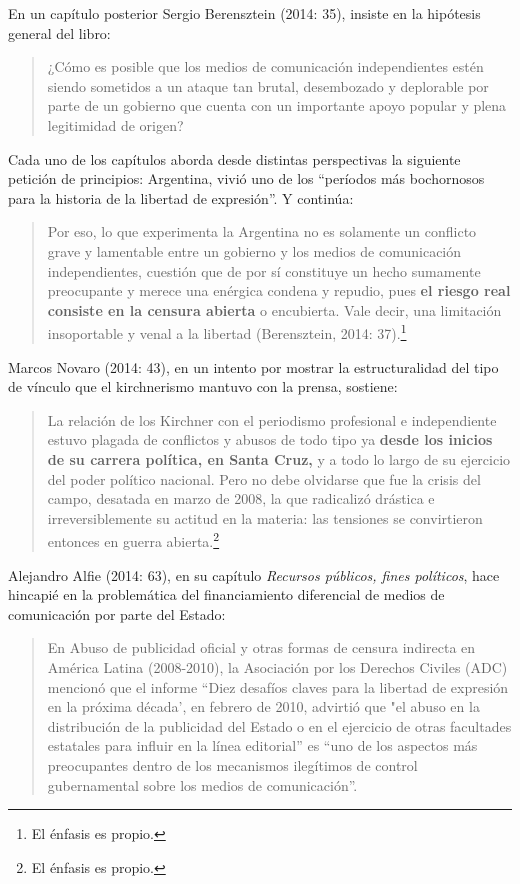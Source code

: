 En un capítulo posterior Sergio Berensztein (2014: 35), insiste en la hipótesis general del libro:

\begin{quote}
¿Cómo es posible que los medios de comunicación independientes estén siendo sometidos a un ataque tan brutal, desembozado y deplorable por parte de un gobierno que cuenta con un importante apoyo popular y plena legitimidad de origen?
\end{quote}

Cada uno de los capítulos aborda desde distintas perspectivas la siguiente petición de principios: Argentina, vivió uno de los ``períodos más bochornosos para la historia de la libertad de expresión''. Y continúa:

\begin{quote}
Por eso, lo que experimenta la Argentina no es solamente un conflicto grave y lamentable entre un gobierno y los medios de comunicación independientes, cuestión que de por sí constituye un hecho sumamente preocupante y merece una enérgica condena y repudio, pues \textbf{el riesgo real consiste en la censura abierta} o encubierta. Vale decir, una limitación insoportable y venal a la libertad (Berensztein, 2014: 37).\footnote{El énfasis es propio.}
\end{quote}

Marcos Novaro (2014: 43), en un intento por mostrar la estructuralidad del tipo de vínculo que el kirchnerismo mantuvo con la prensa, sostiene:

\begin{quote}
La relación de los Kirchner con el periodismo profesional e independiente estuvo plagada de conflictos y abusos de todo tipo ya \textbf{desde los inicios de su carrera política, en Santa Cruz,} y a todo lo largo de su ejercicio del poder político nacional. Pero no debe olvidarse que fue la crisis del campo, desatada en marzo de 2008, la que radicalizó drástica e irreversiblemente su actitud en la materia: las tensiones se convirtieron entonces en guerra abierta.\footnote{El énfasis es propio.}
\end{quote}

Alejandro Alfie (2014: 63), en su capítulo \emph{Recursos públicos, fines políticos}, hace hincapié en la problemática del financiamiento diferencial de medios de comunicación por parte del Estado:

\begin{quote}
En Abuso de publicidad oficial y otras formas de censura indirecta en América Latina (2008-2010), la Asociación por los Derechos Civiles (ADC) mencionó que el informe ``Diez desafíos claves para la libertad de expresión en la próxima década', en febrero de 2010, advirtió que "el abuso en la distribución de la publicidad del Estado o en el ejercicio de otras facultades estatales para influir en la línea editorial'' es ``uno de los aspectos más preocupantes dentro de los mecanismos ilegítimos de control gubernamental sobre los medios de comunicación''.
\end{quote}

